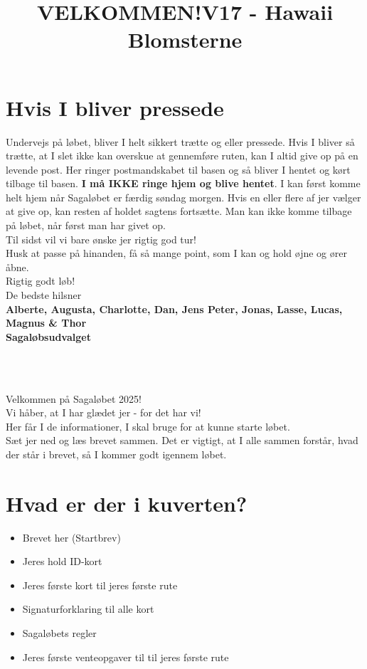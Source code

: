 \section{Hvis I bliver pressede}
Undervejs på løbet, bliver I helt sikkert trætte og eller pressede. Hvis I bliver så trætte, at I slet ikke kan overskue at gennemføre ruten, kan I altid give op på en levende post. Her ringer postmandskabet til basen og så bliver I hentet og kørt tilbage til basen. \textbf{I må IKKE ringe hjem og blive hentet}. I kan først komme helt hjem når Sagaløbet er færdig søndag morgen. Hvis en eller flere af jer vælger at give op, kan resten af holdet sagtens fortsætte. Man kan ikke komme tilbage på løbet, når først man har givet op.\\
\newline
Til sidst vil vi bare ønske jer rigtig god tur!\\
Husk at passe på hinanden, få så mange point, som I kan og hold øjne og ører åbne.\\
\newline
Rigtig godt løb!\\
\newline
\textcolor{søblå}{De bedste hilsner}\\
\textcolor{natblå}{\textbf{Alberte, Augusta, Charlotte, Dan, Jens Peter, Jonas, Lasse, Lucas, Magnus \& Thor}}\\
\textcolor{natblå}{\textbf{Sagaløbsudvalget}}\\
\newpage
\title{VELKOMMEN!}\\
\newline
\title{\textcolor{søblå}{V17 - Hawaii Blomsterne }}\\
\newline
Velkommen på Sagaløbet 2025!\\
Vi håber, at I har glædet jer - for det har vi!\\
Her får I de informationer, I skal bruge for at kunne starte løbet.\\
Sæt jer ned og læs brevet sammen. Det er vigtigt, at I alle sammen forstår, hvad der står i brevet, så I kommer godt igennem løbet.
\section{Hvad er der i kuverten?}
\begin{itemize}
    \item Brevet her (Startbrev)
    \item Jeres hold ID-kort
    \item Jeres første kort til jeres første rute
    \item Signaturforklaring til alle kort
    \item Sagaløbets regler
    \item Jeres første venteopgaver til til jeres første rute
\end{itemize}
